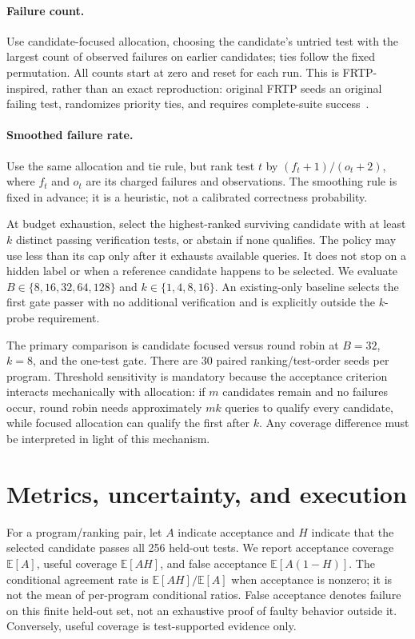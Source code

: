 \documentclass[10pt]{article}
\begin{document}
\paragraph{Failure count.} Use candidate-focused allocation, choosing the candidate's untried test with the largest count of observed failures on earlier candidates; ties follow the fixed permutation. All counts start at zero and reset for each run. This is FRTP-inspired, rather than an exact reproduction: original FRTP seeds an original failing test, randomizes priority ties, and requires complete-suite success~\cite{qi2013frtp}.
\paragraph{Smoothed failure rate.} Use the same allocation and tie rule, but rank test $t$ by $(f_t+1)/(o_t+2)$, where $f_t$ and $o_t$ are its charged failures and observations. The smoothing rule is fixed in advance; it is a heuristic, not a calibrated correctness probability.

At budget exhaustion, select the highest-ranked surviving candidate with at least $k$ distinct passing verification tests, or abstain if none qualifies. The policy may use less than its cap only after it exhausts available queries. It does not stop on a hidden label or when a reference candidate happens to be selected. We evaluate $B\in\{8,16,32,64,128\}$ and $k\in\{1,4,8,16\}$. An existing-only baseline selects the first gate passer with no additional verification and is explicitly outside the $k$-probe requirement.

The primary comparison is candidate focused versus round robin at $B=32$, $k=8$, and the one-test gate. There are 30 paired ranking/test-order seeds per program. Threshold sensitivity is mandatory because the acceptance criterion interacts mechanically with allocation: if $m$ candidates remain and no failures occur, round robin needs approximately $mk$ queries to qualify every candidate, while focused allocation can qualify the first after $k$. Any coverage difference must be interpreted in light of this mechanism.

\section{Metrics, uncertainty, and execution}
For a program/ranking pair, let $A$ indicate acceptance and $H$ indicate that the selected candidate passes all 256 held-out tests. We report acceptance coverage $\mathbb{E}[A]$, useful coverage $\mathbb{E}[AH]$, and false acceptance $\mathbb{E}[A(1-H)]$. The conditional agreement rate is $\mathbb{E}[AH]/\mathbb{E}[A]$ when acceptance is nonzero; it is not the mean of per-program conditional ratios. False acceptance denotes failure on this finite held-out set, not an exhaustive proof of faulty behavior outside it. Conversely, useful coverage is test-supported evidence only.
\end{document}
